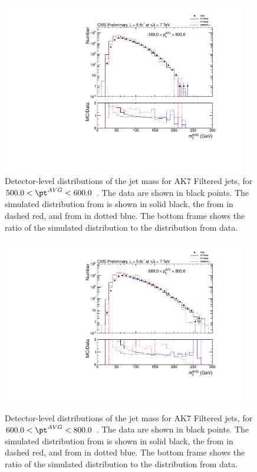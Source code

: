 \begin{figure}[htbp]
\centering
\includegraphics[width=0.95\textwidth]{figs/histAK7MjetVsPtAvg_rawDataMCComparisons_pt_7_Filtered}
\caption{Detector-level distributions of the jet mass for AK7 Filtered jets,
for $500.0 < \pt^{AVG} < 600.0$ \GeVc. The data are shown in black points.
The simulated distribution from \PYTHIA is shown in solid black, 
the from \PYTHIAEIGHT in dashed red, and from \HERWIG in dotted blue. 
The bottom frame shows the ratio of the simulated distribution
to the distribution from data. 
\label{figs:histAK7MjetVsPtAvg_rawDataMCComparisons_pt_7_Filtered}}
\end{figure}



\begin{figure}[htbp]
\centering
\includegraphics[width=0.95\textwidth]{figs/histAK7MjetVsPtAvg_rawDataMCComparisons_pt_8_Filtered}
\caption{Detector-level distributions of the jet mass for AK7 Filtered jets,
for $600.0 < \pt^{AVG} < 800.0$ \GeVc. The data are shown in black points.
The simulated distribution from \PYTHIA is shown in solid black, 
the from \PYTHIAEIGHT in dashed red, and from \HERWIG in dotted blue. 
The bottom frame shows the ratio of the simulated distribution
to the distribution from data. 
\label{figs:histAK7MjetVsPtAvg_rawDataMCComparisons_pt_8_Filtered}}
\end{figure}



